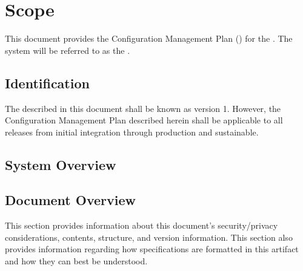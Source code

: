 
\chapter{Scope}
\label{loc:Scope}


This document provides the Configuration Management Plan (\CMPLAN) for the \ThisSystem. 
The system will be referred to as the \ThisSys.

\section{Identification}
\label{loc:Identification}


The \ThisSystem described in this document shall be known as \ThisSys version 1.
However, the Configuration Management Plan {\CMPLAN} described herein shall be applicable to all releases from initial integration through production and sustainable.

\section{System Overview}
\label{loc:SystemOverview}




\section{Document Overview}
\label{loc:DocumentOverview}


This section provides information about this document's security/privacy considerations, contents, structure, and version information.
This section also provides information regarding how specifications are formatted in this artifact and how they can best be understood.







